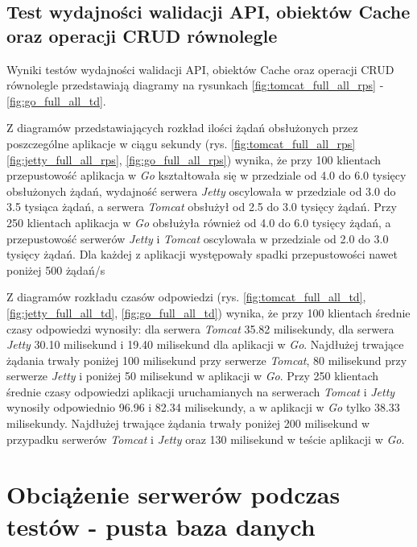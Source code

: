 
\clearpage

\subsection{Test wydajności walidacji API, obiektów Cache oraz operacji CRUD równolegle}

Wyniki testów wydajności walidacji API, obiektów Cache oraz operacji CRUD równolegle przedstawiają diagramy na rysunkach \ref{fig:tomcat_full_all_rps} - \ref{fig:go_full_all_td}.              

Z diagramów przedstawiających rozkład ilości żądań obsłużonych przez poszczególne aplikacje w ciągu sekundy  (rys. \ref{fig:tomcat_full_all_rps} \ref{fig:jetty_full_all_rps}, \ref{fig:go_full_all_rps}) wynika, że przy 100 klientach przepustowość aplikacja w \textsl{Go} kształtowała się w przedziale od 4.0 do 6.0 tysięcy obsłużonych żądań, wydajność serwera \textsl{Jetty} oscylowała w przedziale od 3.0 do 3.5 tysiąca  żądań, a  serwera \textsl{Tomcat}  obsłużył od 2.5 do 3.0 tysięcy żądań. Przy 250 klientach aplikacja w \textsl{Go} obsłużyła również od 4.0 do 6.0 tysięcy żądań, a przepustowość serwerów \textsl{Jetty} i \textsl{Tomcat} oscylowała w przedziale od 2.0 do 3.0 tysięcy żądań. Dla każdej z aplikacji występowały spadki przepustowości nawet poniżej 500 żądań/s

Z diagramów rozkładu czasów odpowiedzi (rys. \ref{fig:tomcat_full_all_td}, \ref{fig:jetty_full_all_td}, \ref{fig:go_full_all_td}) wynika, że przy 100 klientach średnie czasy odpowiedzi wynosiły: dla serwera \textsl{Tomcat} 35.82 milisekundy, dla serwera \textsl{Jetty} 30.10 milisekund i 19.40 milisekund dla aplikacji w \textsl{Go}. Najdłużej trwające żądania trwały poniżej 100 milisekund przy serwerze \textsl{Tomcat}, 80 milisekund przy serwerze \textsl{Jetty} i  poniżej 50 milisekund  w aplikacji w \textsl{Go}. Przy 250 klientach średnie czasy odpowiedzi aplikacji uruchamianych na serwerach \textsl{Tomcat}  i \textsl{Jetty}   wynosiły odpowiednio 96.96 i 82.34 milisekundy, a w aplikacji w \textsl{Go} tylko 38.33 milisekundy. Najdłużej trwające żądania trwały poniżej 200 milisekund w przypadku serwerów \textsl{Tomcat} i \textsl{Jetty} oraz 130 milisekund w teście aplikacji w \textsl{Go}.


\clearpage

\section{Obciążenie serwerów podczas testów - pusta baza danych}


